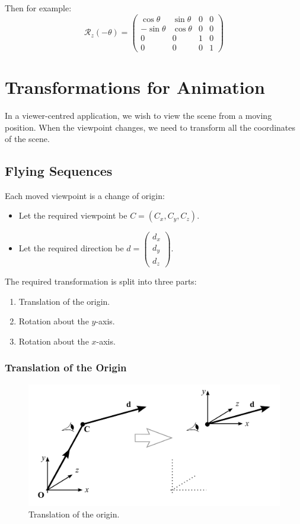 \documentclass[11pt]{article}
\begin{document}
Then for example:
\[
  \mathcal{R}_z(-\theta) = 
  \begin{pmatrix}
    \cos \theta & \sin \theta & 0 & 0 \\
    - \sin \theta & \cos \theta & 0 & 0 \\
    0 & 0 & 1 & 0 \\
    0 & 0 & 0 & 1
  \end{pmatrix}
\]

\section{Transformations for Animation}
In a viewer-centred application, we wish to view the scene from a moving position.
When the viewpoint changes, we need to transform all the coordinates of the scene.

\subsection{Flying Sequences}
Each moved viewpoint is a change of origin:
\begin{itemize}
  \item Let the required viewpoint be $C = (C_x, C_y, C_z)$.
  \item Let the required direction be $d = \begin{pmatrix} d_x \\ d_y \\ d_z \end{pmatrix}$.
\end{itemize}

The required transformation is split into three parts:
\begin{enumerate}
  \item Translation of the origin.
  \item Rotation about the $y$-axis.
  \item Rotation about the $x$-axis.
\end{enumerate}

\subsubsection{Translation of the Origin}

\begin{figure}[h]
  \caption{Translation of the origin.}
  \includegraphics[scale=0.2]{transorigin}
  \centering
\end{figure}
\end{document}
